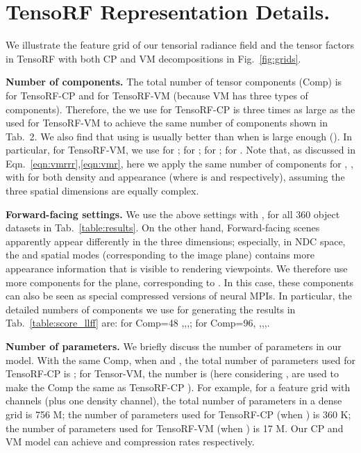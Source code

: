 \documentclass[runningheads]{llncs}
\newcommand{\boldstartspace}[1]{\vspace{0.1in}\noindent\textbf{#1}}
\begin{document}
 


%
 




\appendix
\clearpage{}





\renewcommand{\gold}[1]{\colorbox{bronze}{{#1}}}
\renewcommand{\gold}[1]{\textbf{#1}}

\section{TensoRF Representation Details.}
We illustrate the feature grid of our tensorial radiance field and the tensor factors in TensoRF with both CP and VM decompositions in Fig.~\ref{fig:grids}.

\boldstartspace{Number of components.}
The total number of tensor components (Comp) is  for TensoRF-CP and  for TensoRF-VM (because VM has three types of components). Therefore, the  we use for TensoRF-CP is three times as large as the  used for TensoRF-VM to achieve the same number of components shown in Tab.~2.
We also find that using  is usually better than  when  is large enough ().
In particular, for TensoRF-VM, we use  for ;  for ;  for ;  for . Note that, as discussed in Eqn.~\ref{eqn:vmrrr},\ref{eqn:vmr}, here we apply the same number of components for , ,  with  for both density and appearance (where  is  and  respectively), assuming the three spatial dimensions are equally complex.

\boldstartspace{Forward-facing settings.}
We use the above settings with , for all 360 object datasets in Tab.~\ref{table:results}.  On the other hand, Forward-facing scenes apparently appear differently in the three dimensions; especially, in NDC space, the  and  spatial modes (corresponding to the image plane) contains more appearance information that is visible to rendering viewpoints. We therefore use more components for the  plane, corresponding to . In this case, these  components can also be seen as special compressed versions of neural MPIs. In particular, the detailed numbers of components we use for generating the results in Tab.~\ref{table:score_llff} are: for Comp=48 ,,,; for Comp=96, ,,,.

\boldstartspace{Number of parameters.}
We briefly discuss the number of parameters in our model.
With the same Comp, when  and , the total number of parameters used for TensoRF-CP is ; for Tensor-VM, the number is  (here considering ,  are used to make the Comp the same as TensoRF-CP ). For example, for a  feature grid with  channels (plus one density channel), the total number of parameters in a dense grid is 756 M; the number of parameters used for TensoRF-CP (when ) is 360 K; the number of parameters used for TensoRF-VM (when ) is 17 M.
Our CP and VM model can achieve  and  compression rates respectively.
\end{document}
